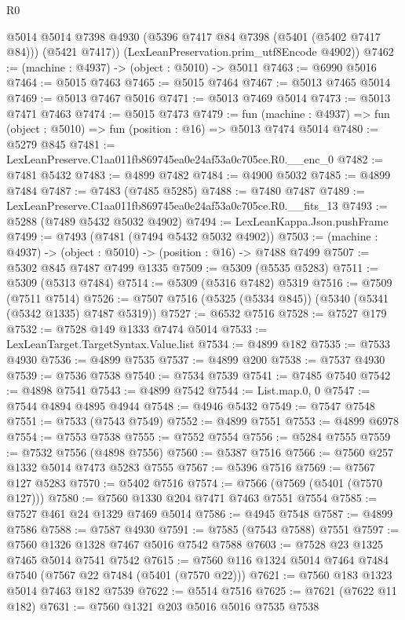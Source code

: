 \begin{lexlean}{R0}
\begin{coremodule}
        @5014
        @5014
        @7398
        @4930
        (@5396 @7417 @84 @7398 (@5401 (@5402 @7417 @84)))
        (@5421 @7417))
      (LexLeanPreservation.prim_utf8Encode @4902))
@7462 := (machine : @4937) -> (object : @5010) -> @5011
@7463 := @6990 @5016
@7464 := @5015 @7463
@7465 := @5015 @7464
@7467 := @5013 @7465 @5014
@7469 := @5013 @7467 @5016
@7471 := @5013 @7469 @5014
@7473 := @5013 @7471 @7463
@7474 := @5015 @7473
@7479 := fun (machine : @4937) => fun (object : @5010) => fun (position : @16) => @5013 @7474 @5014
@7480 := @5279 @845
@7481 := LexLeanPreserve.C1aa011fb869745ea0e24af53a0c705ce.R0.__enc_0
@7482 := @7481 @5432
@7483 := @4899 @7482
@7484 := @4900 @5032
@7485 := @4899 @7484
@7487 := @7483 (@7485 @5285)
@7488 := @7480 @7487
@7489 := LexLeanPreserve.C1aa011fb869745ea0e24af53a0c705ce.R0.__fits_13
@7493 := @5288 (@7489 @5432 @5032 @4902)
@7494 := LexLeanKappa.Json.pushFrame
@7499 := @7493 (@7481 (@7494 @5432 @5032 @4902))
@7503 := (machine : @4937) -> (object : @5010) -> (position : @16) -> @7488 @7499
@7507 := @5302 @845 @7487 @7499 @1335
@7509 := @5309 (@5535 @5283)
@7511 := @5309 (@5313 @7484)
@7514 := @5309 (@5316 @7482) @5319
@7516 := @7509 (@7511 @7514)
@7526 := @7507 @7516 (@5325 (@5334 @845)) (@5340 (@5341 (@5342 @1335) @7487 @5319))
@7527 := @6532 @7516
@7528 := @7527 @179
@7532 := @7528 @149 @1333 @7474 @5014
@7533 := LexLeanTarget.TargetSyntax.Value.list
@7534 := @4899 @182
@7535 := @7533 @4930
@7536 := @4899 @7535
@7537 := @4899 @200
@7538 := @7537 @4930
@7539 := @7536 @7538
@7540 := @7534 @7539
@7541 := @7485 @7540
@7542 := @4898 @7541
@7543 := @4899 @7542
@7544 := List.map.{0, 0}
@7547 := @7544 @4894 @4895 @4944
@7548 := @4946 @5432
@7549 := @7547 @7548
@7551 := @7533 (@7543 @7549)
@7552 := @4899 @7551
@7553 := @4899 @6978
@7554 := @7553 @7538
@7555 := @7552 @7554
@7556 := @5284 @7555
@7559 := @7532 @7556 (@4898 @7556)
@7560 := @5387 @7516
@7566 := @7560 @257 @1332 @5014 @7473 @5283 @7555
@7567 := @5396 @7516
@7569 := @7567 @127 @5283
@7570 := @5402 @7516
@7574 := @7566 (@7569 (@5401 (@7570 @127)))
@7580 := @7560 @1330 @204 @7471 @7463 @7551 @7554
@7585 := @7527 @461 @24 @1329 @7469 @5014
@7586 := @4945 @7548
@7587 := @4899 @7586
@7588 := @7587 @4930
@7591 := @7585 (@7543 @7588) @7551
@7597 := @7560 @1326 @1328 @7467 @5016 @7542 @7588
@7603 := @7528 @23 @1325 @7465 @5014 @7541 @7542
@7615 := @7560 @116 @1324 @5014 @7464 @7484 @7540 (@7567 @22 @7484 (@5401 (@7570 @22)))
@7621 := @7560 @183 @1323 @5014 @7463 @182 @7539
@7622 := @5514 @7516
@7625 := @7621 (@7622 @11 @182)
@7631 := @7560 @1321 @203 @5016 @5016 @7535 @7538

\end{coremodule}
\end{lexlean}
